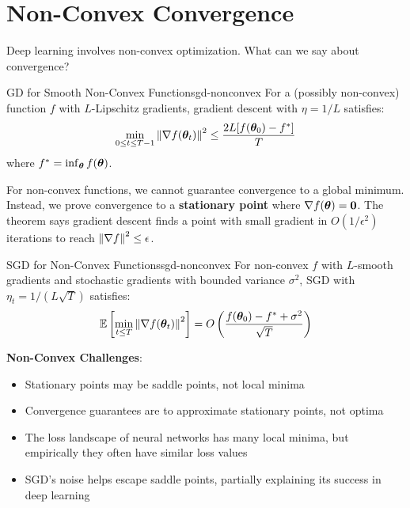 \documentclass[../../main.tex]{subfiles}
\begin{document}
\section{Non-Convex Convergence}
\label{sec:nonconvex-convergence}

Deep learning involves non-convex optimization. What can we say about convergence?

\begin{theorem}{GD for Smooth Non-Convex Functions}{gd-nonconvex}
For a (possibly non-convex) function $f$ with $L$-Lipschitz gradients, gradient descent with $\eta = 1/L$ satisfies:
\[
    \min_{0 \leq t \leq T-1} \left\lVert \nabla f(\boldsymbol{\theta}_t) \right\rVert^2 \leq \frac{2L[f(\boldsymbol{\theta}_0) - f^*]}{T}
\]
where $f^* = \inf_{\boldsymbol{\theta}} f(\boldsymbol{\theta})$.
\end{theorem}

\begin{intuition}
For non-convex functions, we cannot guarantee convergence to a global minimum. Instead, we prove convergence to a \textbf{stationary point} where $\nabla f(\boldsymbol{\theta}) = \mathbf{0}$. The theorem says gradient descent finds a point with small gradient in $O(1/\epsilon^2)$ iterations to reach $\left\lVert \nabla f \right\rVert^2 \leq \epsilon$.
\end{intuition}

\begin{theorem}{SGD for Non-Convex Functions}{sgd-nonconvex}
For non-convex $f$ with $L$-smooth gradients and stochastic gradients with bounded variance $\sigma^2$, SGD with $\eta_t = 1/(L\sqrt{T})$ satisfies:
\[
    \operatorname{\mathbb{E}}\left[\min_{t \leq T} \left\lVert \nabla f(\boldsymbol{\theta}_t) \right\rVert^2\right] = O\left(\frac{f(\boldsymbol{\theta}_0) - f^* + \sigma^2}{\sqrt{T}}\right)
\]
\end{theorem}

\begin{important}
\textbf{Non-Convex Challenges}:
\begin{itemize}
    \item Stationary points may be saddle points, not local minima
    \item Convergence guarantees are to approximate stationary points, not optima
    \item The loss landscape of neural networks has many local minima, but empirically they often have similar loss values
    \item SGD's noise helps escape saddle points, partially explaining its success in deep learning
\end{itemize}
\end{important}
\end{document}
